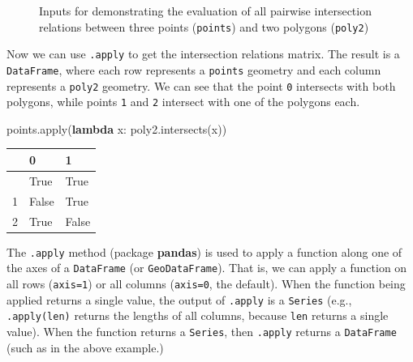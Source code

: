 \documentclass[
  letterpaper,
]{krantz}
\newenvironment{Shaded}{\begin{snugshade}}{\end{snugshade}}
\newcommand{\BuiltInTok}[1]{\textcolor[rgb]{0.00,0.23,0.31}{#1}}
\newcommand{\KeywordTok}[1]{\textcolor[rgb]{0.00,0.23,0.31}{\textbf{#1}}}
\newcommand{\NormalTok}[1]{\textcolor[rgb]{0.00,0.23,0.31}{#1}}
\begin{document}
\begin{figure}[H]


\caption{\label{fig-spatial-relations-geoms2}Inputs for demonstrating
the evaluation of all pairwise intersection relations between three
points (\texttt{points}) and two polygons (\texttt{poly2})}

\end{figure}%

Now we can use \texttt{.apply} to get the intersection relations matrix.
The result is a \texttt{DataFrame}, where each row represents a
\texttt{points} geometry and each column represents a \texttt{poly2}
geometry. We can see that the point \texttt{0} intersects with both
polygons, while points \texttt{1} and \texttt{2} intersect with one of
the polygons each.

\begin{Shaded}
\begin{Highlighting}[]
\NormalTok{points.}\BuiltInTok{apply}\NormalTok{(}\KeywordTok{lambda}\NormalTok{ x: poly2.intersects(x))}
\end{Highlighting}
\end{Shaded}

\begin{longtable}[]{@{}lll@{}}
\toprule\noalign{}
& 0 & 1 \\
\midrule\noalign{}
\endhead
\bottomrule\noalign{}
\endlastfoot
0 & True & True \\
1 & False & True \\
2 & True & False \\
\end{longtable}

\begin{tcolorbox}[enhanced jigsaw, title=\textcolor{quarto-callout-note-color}{\faInfo}\hspace{0.5em}{Note}, coltitle=black, colbacktitle=quarto-callout-note-color!10!white, breakable, titlerule=0mm, colframe=quarto-callout-note-color-frame, opacitybacktitle=0.6, colback=white, bottomrule=.15mm, left=2mm, leftrule=.75mm, toprule=.15mm, toptitle=1mm, bottomtitle=1mm, arc=.35mm, opacityback=0, rightrule=.15mm]

The \texttt{.apply} method (package \textbf{pandas}) is used to apply a
function along one of the axes of a \texttt{DataFrame} (or
\texttt{GeoDataFrame}). That is, we can apply a function on all rows
(\texttt{axis=1}) or all columns (\texttt{axis=0}, the default). When
the function being applied returns a single value, the output of
\texttt{.apply} is a \texttt{Series} (e.g., \texttt{.apply(len)} returns
the lengths of all columns, because \texttt{len} returns a single
value). When the function returns a \texttt{Series}, then
\texttt{.apply} returns a \texttt{DataFrame} (such as in the above
example.)

\end{tcolorbox}
\end{document}

